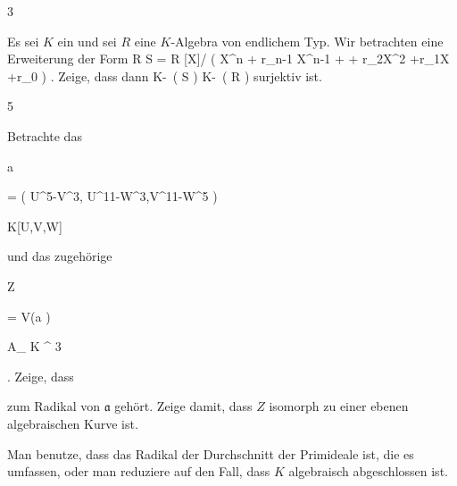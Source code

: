 {} {}



{3}

{


Es sei $K$ ein
und sei $R$ eine $K$-Algebra von endlichem Typ. Wir betrachten eine
Erweiterung der Form
\maabbdisp {\varphi} { R } { S = R [X]/ \left(  X^n + r_{n-1} X^{n-1} + \cdots + r_2X^2 +r_1X +r_0  \right)
} {.}
Zeige, dass dann
\maabb {\varphi^*} { K\!-\!\, \left(  S  \right) } { K\!-\!\, \left(  R  \right)
} {} surjektiv ist.


}

{} {}



{5}

{


Betrachte das


\mavergleichskettedisp

{\vergleichskette

{ {\mathfrak a}
}

{ =} { \left(  U^5-V^3, U^{11}-W^3,V^{11}-W^5  \right)
}

{ \subseteq} { K[U,V,W]
}

{ } {
}

{ } {
}

}
{}{}{}
und das zugehörige


\mavergleichskette

{\vergleichskette

{ Z
}

{ = }{ V({\mathfrak a} )
}

{ \subseteq }{ { {\mathbb A}_{ K }^{  3   } }
}

{    }{
}

{   }{
}

}
{}{}{.}
Zeige, dass

 zum Radikal von ${\mathfrak a}$ gehört. Zeige damit, dass $Z$ isomorph zu einer ebenen algebraischen Kurve ist.


}

{} {Man benutze, dass das Radikal der Durchschnitt der Primideale ist, die es umfassen, oder man reduziere auf den Fall, dass $K$ algebraisch abgeschlossen ist.}
